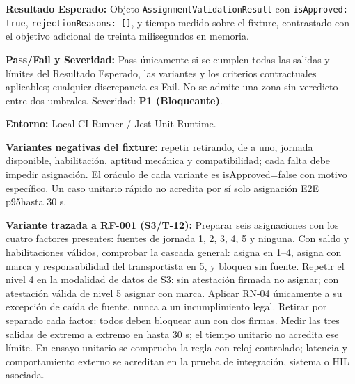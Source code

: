 \par\noindent\textbf{Resultado Esperado:} Objeto \texttt{A\allowbreak{}s\allowbreak{}s\allowbreak{}i\allowbreak{}g\allowbreak{}n\allowbreak{}m\allowbreak{}e\allowbreak{}n\allowbreak{}t\allowbreak{}V\allowbreak{}a\allowbreak{}l\allowbreak{}i\allowbreak{}d\allowbreak{}a\allowbreak{}t\allowbreak{}i\allowbreak{}o\allowbreak{}n\allowbreak{}R\allowbreak{}e\allowbreak{}s\allowbreak{}u\allowbreak{}l\allowbreak{}t\allowbreak{}} con \texttt{i\allowbreak{}s\allowbreak{}A\allowbreak{}p\allowbreak{}p\allowbreak{}r\allowbreak{}o\allowbreak{}v\allowbreak{}e\allowbreak{}d\allowbreak{}:\allowbreak{} t\allowbreak{}r\allowbreak{}u\allowbreak{}e\allowbreak{}}, \texttt{r\allowbreak{}e\allowbreak{}j\allowbreak{}e\allowbreak{}c\allowbreak{}t\allowbreak{}i\allowbreak{}o\allowbreak{}n\allowbreak{}R\allowbreak{}e\allowbreak{}a\allowbreak{}s\allowbreak{}o\allowbreak{}n\allowbreak{}s\allowbreak{}:\allowbreak{} [\allowbreak{}]\allowbreak{}}, y tiempo medido sobre el fixture, contrastado con el objetivo adicional de treinta milisegundos en memoria.\par
\par\noindent\textbf{Pass/Fail y Severidad:} Pass únicamente si se cumplen todas las salidas y límites del Resultado Esperado, las variantes y los criterios contractuales aplicables; cualquier discrepancia es Fail. No se admite una zona sin veredicto entre dos umbrales. Severidad: \textbf{P1 (Bloqueante)}.\par
\par\noindent\textbf{Entorno:} Local CI Runner / Jest Unit Runtime.\par






\par\noindent\textbf{Variantes negativas del fixture:} repetir retirando, de a uno, jornada disponible, habilitación, aptitud mecánica y compatibilidad; cada falta debe impedir asignación. El oráculo de cada variante es isApproved=false con motivo específico. Un caso unitario rápido no acredita por sí solo asignación E2E p95hasta 30 s.\par\par


\par\noindent\textbf{Variante trazada a RF-001 (S3/T-12):} Preparar seis asignaciones con los cuatro factores presentes: fuentes de jornada 1, 2, 3, 4, 5 y ninguna. Con saldo y habilitaciones válidos, comprobar la cascada general: asigna en 1–4, asigna con marca y responsabilidad del transportista en 5, y bloquea sin fuente. Repetir el nivel 4 en la modalidad de datos de S3: sin atestación firmada no asignar; con atestación válida de nivel 5 asignar con marca. Aplicar RN-04 únicamente a su excepción de caída de fuente, nunca a un incumplimiento legal. Retirar por separado cada factor: todos deben bloquear aun con dos firmas. Medir las tres salidas de extremo a extremo en hasta 30 s; el tiempo unitario no acredita ese límite. En ensayo unitario se comprueba la regla con reloj controlado; latencia y comportamiento externo se acreditan en la prueba de integración, sistema o HIL asociada.\par

